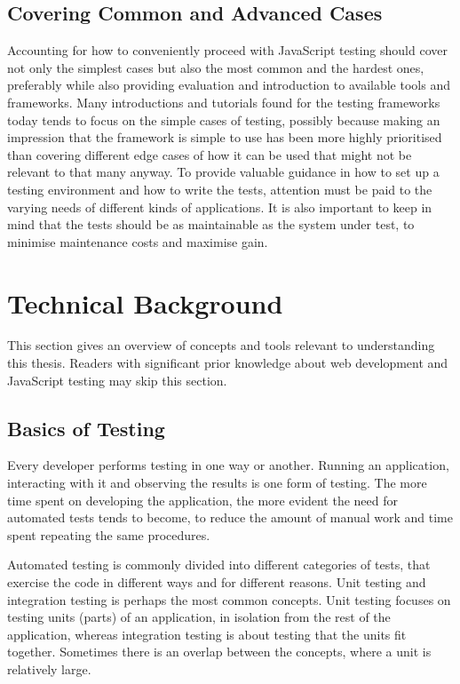 \documentclass[11pt]{article}
\begin{document}
\subsection{Covering Common and Advanced Cases}

Accounting for how to conveniently proceed with JavaScript testing should cover not only the simplest cases but also the most common and the hardest ones, preferably while also providing evaluation and introduction to available tools and frameworks. Many introductions and tutorials found for the testing frameworks today tends to focus on the simple cases of testing, possibly because making an impression that the framework is simple to use has been more highly prioritised than covering different edge cases of how it can be used that might not be relevant to that many anyway. To provide valuable guidance in how to set up a testing environment and how to write the tests, attention must be paid to the varying needs of different kinds of applications. It is also important to keep in mind that the tests should be as maintainable as the system under test, to minimise maintenance costs and maximise gain.

\section{Technical Background}

This section gives an overview of concepts and tools relevant to understanding this thesis. Readers with significant prior knowledge about web development and JavaScript testing may skip this section.

\subsection{Basics of Testing}

Every developer performs testing in one way or another. Running an application, interacting with it and observing the results is one form of testing. The more time spent on developing the application, the more evident the need for automated tests tends to become, to reduce the amount of manual work and time spent repeating the same procedures.

Automated testing is commonly divided into different categories of tests, that exercise the code in different ways and for different reasons. Unit testing and integration testing is perhaps the most common concepts. Unit testing focuses on testing units (parts) of an application, in isolation from the rest of the application, whereas integration testing is about testing that the units fit together. Sometimes there is an overlap between the concepts, where a unit is relatively large.
\end{document}

